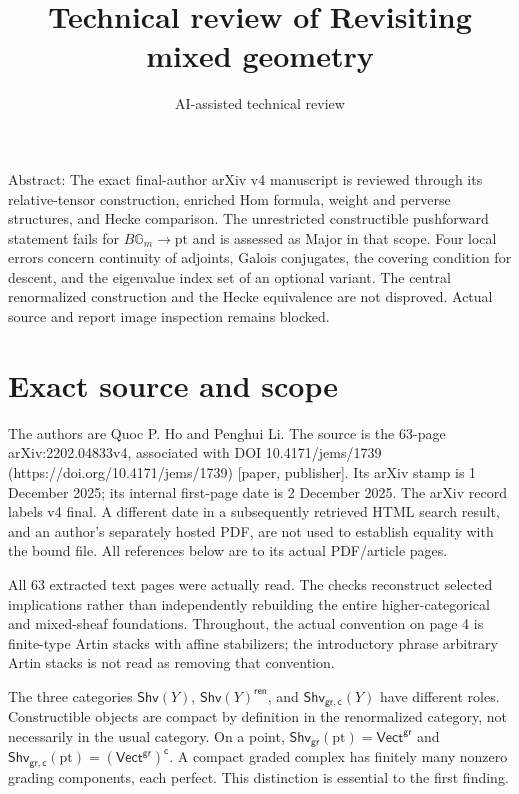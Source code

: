 \documentclass[10pt]{article}
\title{Technical review of Revisiting mixed geometry}
\author{AI-assisted technical review}
\date{}
\begin{document}
\maketitle
Abstract: The exact final-author arXiv v4 manuscript is reviewed through its relative-tensor construction, enriched Hom formula, weight and perverse structures, and Hecke comparison. The unrestricted constructible pushforward statement fails for \(B\mathbb G_m\to\mathrm{pt}\) and is assessed as Major in that scope. Four local errors concern continuity of adjoints, Galois conjugates, the covering condition for descent, and the eigenvalue index set of an optional variant. The central renormalized construction and the Hecke equivalence are not disproved. Actual source and report image inspection remains blocked.\par
\section*{Exact source and scope}
The authors are Quoc P. Ho and Penghui Li. The source is the 63-page arXiv:2202.04833v4, associated with DOI 10.4171/jems/1739 (https://doi.org/10.4171/jems/1739) [paper, publisher]. Its arXiv stamp is 1 December 2025; its internal first-page date is 2 December 2025. The arXiv record labels v4 final. A different date in a subsequently retrieved HTML search result, and an author’s separately hosted PDF, are not used to establish equality with the bound file. All references below are to its actual PDF/article pages.\par
All 63 extracted text pages were actually read. The checks reconstruct selected implications rather than independently rebuilding the entire higher-categorical and mixed-sheaf foundations. Throughout, the actual convention on page 4 is finite-type Artin stacks with affine stabilizers; the introductory phrase arbitrary Artin stacks is not read as removing that convention.\par
The three categories \(\mathsf{Shv}(Y)\), \(\mathsf{Shv}(Y)^{\mathsf{ren}}\), and \(\mathsf{Shv}_{\mathsf{gr},\mathsf c}(Y)\) have different roles. Constructible objects are compact by definition in the renormalized category, not necessarily in the usual category. On a point, \(\mathsf{Shv}_{\mathsf{gr}}(\mathrm{pt})=\mathsf{Vect}^{\mathsf{gr}}\) and \(\mathsf{Shv}_{\mathsf{gr},\mathsf c}(\mathrm{pt})=(\mathsf{Vect}^{\mathsf{gr}})^{\mathsf c}\). A compact graded complex has finitely many nonzero grading components, each perfect. This distinction is essential to the first finding.\par
\end{document}
